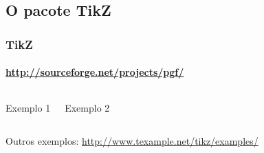 \documentclass[handout,10pt]{beamer}
\begin{document}
\subsection{O pacote TikZ}
\begin{frame}
	\frametitle{TikZ}
	\framesubtitle{\href{http://sourceforge.net/projects/pgf/}{http://sourceforge.net/projects/pgf/}}
		
	\begin{columns}
		\begin{block}{Exemplo 1}
			\usebox{\exemploA}
		\end{block}
		
		\begin{block}{Exemplo 2}
			\rule[0.5\alturaB-0.5\alturaA]{0pt}{\alturaA}\usebox{\exemploB}
		\end{block}
	\end{columns}

	\vfill

	\begin{center}
		\footnotesize
		Outros exemplos: \href{http://www.texample.net/tikz/examples/}{http://www.texample.net/tikz/examples/}
	\end{center}
	
\end{frame}
\savebox{}
\settoheight\alturaA{\usebox{\exemploA}}
\savebox{}
\settoheight\alturaB{\usebox{\exemploB}}
\end{document}
